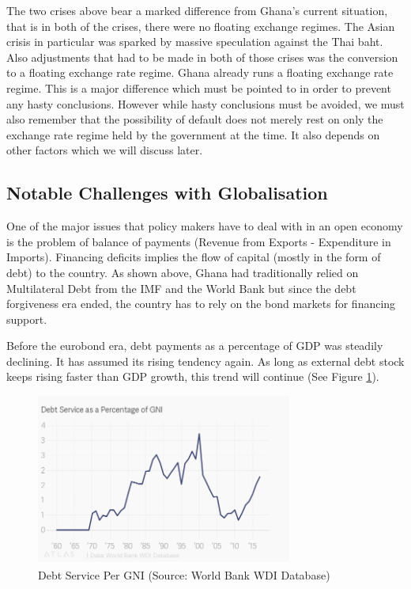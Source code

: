\documentclass[a4paper, 12pt]{article}
\begin{document}
	The two crises above bear a marked difference from Ghana's current situation, that is in both of the crises, there were no floating exchange regimes. The Asian crisis in particular was sparked by massive speculation against the Thai baht. Also adjustments that had to be made in both of those crises was the conversion to a floating exchange rate regime. Ghana already runs a floating exchange rate regime. This is a major difference which must be pointed to in order to prevent any hasty conclusions. However while hasty conclusions must be avoided, we must also remember that the possibility of default does not merely rest on only the exchange rate regime held by the government at the time. It also depends on other factors which we will discuss later.

	\subsection{Notable Challenges with Globalisation}
	
	One of the major issues that policy makers have to deal with in an open economy is the problem of balance of payments (Revenue from Exports - Expenditure in Imports). Financing deficits implies the flow of capital (mostly in the form of debt) to the country. As shown above, Ghana had traditionally relied on Multilateral Debt from the IMF and the World Bank but since the debt forgiveness era ended, the country has to rely on the bond markets for financing support.
	
	Before the eurobond era, debt payments as a percentage of GDP
	was steadily declining. It has assumed its rising tendency again. As
	long as external debt stock keeps rising faster than GDP growth,
	this trend will continue (See Figure \ref*{fig:debtpergni}).
	
	\begin{figure}[h]
		\centering
		\includegraphics*[width=0.75\textwidth]{Data/debt_per_gni.png}
		\caption[Debt Service As a Percentage of GNI]{Debt Service Per GNI (Source: World Bank WDI Database)}
		\label{fig:debtpergni}
	\end{figure}
	
\end{document}
